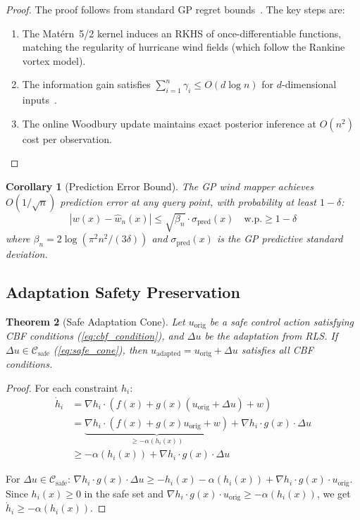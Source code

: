 \documentclass[11pt,twocolumn]{article}
\providecommand{\Cref}[1]{\ref{#1}}
\newtheorem{theorem}{Theorem}[section]
\newtheorem{corollary}[theorem]{Corollary}
\theoremstyle{definition}
\newcommand{\cC}{\mathcal{C}}
\begin{document}
\begin{proof}
The proof follows from standard GP regret bounds~\citep{Srinivas2010}. The key steps are:
\begin{enumerate}[leftmargin=*]
    \item The Mat\'ern~5/2 kernel induces an RKHS of once-differentiable functions, matching the regularity of hurricane wind fields (which follow the Rankine vortex model).
    \item The information gain satisfies $\sum_{i=1}^n \gamma_i \leq O(d \log n)$ for $d$-dimensional inputs~\citep{Srinivas2010, Lemma 5.4}.
    \item The online Woodbury update maintains exact posterior inference at $O(n^2)$ cost per observation.
\end{enumerate}
\end{proof}

\begin{corollary}[Prediction Error Bound]
\label{cor:prediction_error}
The GP wind mapper achieves $O(1/\sqrt{n})$ prediction error at any query point, with probability at least $1 - \delta$:
\begin{equation}
|w(x) - \hat{w}_n(x)| \leq \sqrt{\beta_n} \cdot \sigma_{\text{pred}}(x) \quad \text{w.p.} \geq 1 - \delta
\end{equation}
where $\beta_n = 2\log(\pi^2 n^2 / (3\delta))$ and $\sigma_{\text{pred}}(x)$ is the GP predictive standard deviation.
\end{corollary}

\subsection{Adaptation Safety Preservation}

\begin{theorem}[Safe Adaptation Cone]
\label{thm:safe_cone}
Let $u_{\text{orig}}$ be a safe control action satisfying CBF conditions (\Cref{eq:cbf_condition}), and $\Delta u$ be the adaptation from RLS. If $\Delta u \in \cC_{\text{safe}}$ (\Cref{eq:safe_cone}), then $u_{\text{adapted}} = u_{\text{orig}} + \Delta u$ satisfies all CBF conditions.
\end{theorem}

\begin{proof}
For each constraint $h_i$:
\begin{align}
\dot{h}_i &= \nabla h_i \cdot (f(x) + g(x)(u_{\text{orig}} + \Delta u) + w) \\
&= \underbrace{\nabla h_i \cdot (f(x) + g(x)u_{\text{orig}} + w)}_{\geq -\alpha(h_i(x))} + \nabla h_i \cdot g(x) \cdot \Delta u \\
&\geq -\alpha(h_i(x)) + \nabla h_i \cdot g(x) \cdot \Delta u
\end{align}

For $\Delta u \in \cC_{\text{safe}}$: $\nabla h_i \cdot g(x) \cdot \Delta u \geq -h_i(x) - \alpha(h_i(x)) + \nabla h_i \cdot g(x) \cdot u_{\text{orig}}$. Since $h_i(x) \geq 0$ in the safe set and $\nabla h_i \cdot g(x) \cdot u_{\text{orig}} \geq -\alpha(h_i(x))$, we get $\dot{h}_i \geq -\alpha(h_i(x))$.
\end{proof}
\end{document}
